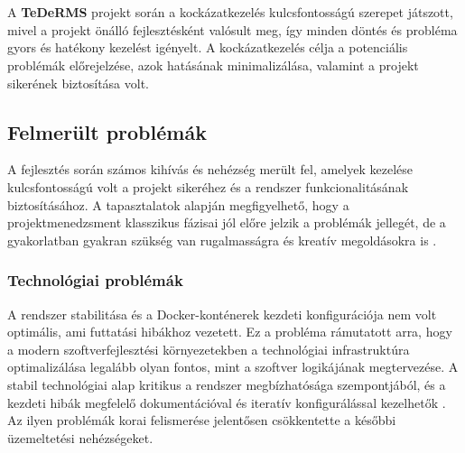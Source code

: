 \chapter{\riskproblem}

A \textbf{TeDeRMS} projekt során a kockázatkezelés kulcsfontosságú szerepet játszott, 
mivel a projekt önálló fejlesztésként valósult meg, így minden döntés és probléma gyors és hatékony kezelést igényelt. 
A kockázatkezelés célja a potenciális problémák előrejelzése, azok hatásának minimalizálása, 
valamint a projekt sikerének biztosítása volt.

\section{Felmerült problémák}

A fejlesztés során számos kihívás és nehézség merült fel, amelyek kezelése kulcsfontosságú volt a 
projekt sikeréhez és a rendszer funkcionalitásának biztosításához. 
A tapasztalatok alapján megfigyelhető, hogy a projektmenedzsment klasszikus fázisai jól előre jelzik a 
problémák jellegét, de a gyakorlatban gyakran szükség van rugalmasságra és kreatív megoldásokra is \cite{Hajdu2014,Szalay2018}.

\subsection{Technológiai problémák}
A rendszer stabilitása és a Docker-konténerek kezdeti konfigurációja nem volt optimális, ami futtatási hibákhoz vezetett.
Ez a probléma rámutatott arra, hogy a modern szoftverfejlesztési környezetekben a technológiai infrastruktúra 
optimalizálása legalább olyan fontos, mint a szoftver logikájának megtervezése. 
A stabil technológiai alap kritikus a rendszer megbízhatósága szempontjából, 
és a kezdeti hibák megfelelő dokumentációval és iteratív konfigurálással kezelhetők \cite{Kovacs2016,Kaposi2019}. 
Az ilyen problémák korai felismerése jelentősen csökkentette a későbbi üzemeltetési nehézségeket.

